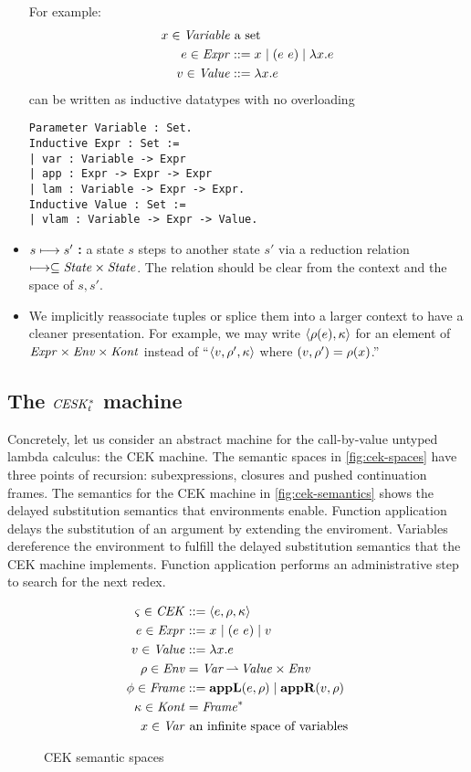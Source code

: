 \begin{itemize}
{For example:
\begin{align*}
  x \in \mathit{Variable} &\text{ a set} \\
  e \in \mathit{Expr} &::= x^{{}} \mathrel{\mid} (e\ e){} \mathrel{\mid} \lambda{} x. e \\
  v \in \mathit{Value} &::= \lambda{} x. e
\end{align*}
can be written as inductive datatypes with no overloading
\begin{verbatim}
Parameter Variable : Set.
Inductive Expr : Set :=
| var : Variable -> Expr
| app : Expr -> Expr -> Expr
| lam : Variable -> Expr -> Expr.
Inductive Value : Set :=
| vlam : Variable -> Expr -> Value.
\end{verbatim}}
\item{$s \longmapsto s'$ \textbf{:} a state $s$ steps to another state $s'$ via a reduction relation $\longmapsto \subseteq \mathit{State} \times \mathit{State}$. The relation should be clear from the context and the space of $s, s'$.}
\item{We implicitly reassociate tuples or splice them into a larger context to have a cleaner presentation.
For example, we may write $\langle \rho(e), \kappa \rangle$ for an element of $\mathit{Expr} \times \mathit{Env} \times \mathit{Kont}$ instead of ``$\langle v,\rho',\kappa \rangle$ where $(v,\rho') = \rho(x)$.''}
\end{itemize}

\subsection{The $\mathit{CESK^*_t}$ machine}

Concretely, let us consider an abstract machine for the call-by-value untyped lambda calculus: the CEK machine.
%
The semantic spaces in \autoref{fig:cek-spaces} have three points of recursion: subexpressions, closures and pushed continuation frames.
%
The semantics for the CEK machine in \autoref{fig:cek-semantics} shows the delayed substitution semantics that environments enable.
%
Function application delays the substitution of an argument by extending the enviroment.
%
Variables dereference the environment to fulfill the delayed substitution semantics that the CEK machine implements.
%
Function application performs an administrative step to search for the next redex.
\begin{figure}\centering  
  \begin{align*}
    \varsigma \in \mathit{CEK} &::= \langle e, \rho, \kappa \rangle \\
    e \in \mathit{Expr} &::= x^{{}} \mathrel{\mid} (e\ e){} \mathrel{\mid} v \\
    v \in \mathit{Value} &::= \lambda{} x. e \\
    \rho \in \mathit{Env} &= \mathit{Var} \operatorname*{\rightharpoonup} \mathit{Value} \times \mathit{Env} \\
    \phi \in \mathit{Frame} &::= \mathbf{appL}(e,\rho) \mathrel{\mid} \mathbf{appR}(v,\rho) \\
    \kappa \in \mathit{Kont} &= \mathit{Frame}^* \\
    x \in \mathit{Var} & \text{ an infinite space of variables}
  \end{align*}
  \caption{CEK semantic spaces}
\label{fig:cek-spaces}
\end{figure}

